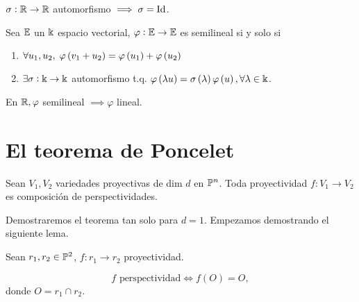 \begin{ej}
    $\sigma : \mathbb{R} \to \mathbb{R}$ automorfismo $\implies \sigma = \operatorname{Id}$.
\end{ej}
\begin{defi}
    Sea $\mathbb{E}$ un $\Bbbk$ espacio vectorial, $\varphi : \mathbb{E} \to \mathbb{E}$ es semilineal si y solo si
    \begin{enumerate}[(1)]
        \item $\forall u_1, u_2, \; \varphi \left( v_1 + u_2 \right) = \varphi \left( u_1 \right) + \varphi \left( u_2 \right)$
        \item $\exists \sigma: \Bbbk \to \Bbbk$ automorfismo t.q. $\varphi \left( \lambda u \right) = \sigma \left( \lambda \right) \varphi \left( u \right), \forall \lambda \in \Bbbk$.
    \end{enumerate}
\end{defi}
\begin{obs}
    En $\mathbb{R}, \varphi$ semilineal $\implies \varphi$ lineal.
\end{obs}

\section{El teorema de Poncelet}

\begin{teo}[de Poncelet]
    Sean $V_1, V_2$ variedades proyectivas de dim $d$ en $\mathbb{P}^n$. Toda proyectividad $f \colon V_1 \to V_2$
    es composición de perspectividades.
\end{teo}

Demostraremos el teorema tan solo para $d = 1$. Empezamos
demostrando el siguiente lema.

\begin{lema} 
    \label{lema_poncelet}
    Sean $r_1, r_2 \in \mathbb{P}^2$, $f \colon r_1 \to r_2$ proyectividad.
    
    \[f \text{ perspectividad} \iff f(O) = O,\]
    donde $O = r_1 \cap r_2$.
\end{lema}

